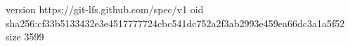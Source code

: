 version https://git-lfs.github.com/spec/v1
oid sha256:cf33b5133432e3e4517777724cbc541dc752a2f3ab2993e459ea66dc3a1a5f52
size 3599
